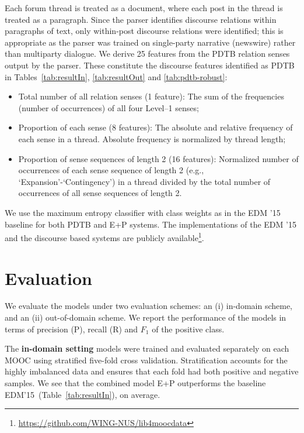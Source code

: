 \documentclass[letterpaper]{article}
\begin{document}
Each forum thread is treated as a document, where each post in the thread 
is treated as a paragraph. Since the parser identifies discourse relations 
within paragraphs of text, only within-post discourse relations 
were identified; this is appropriate as the parser was trained on
single-party narrative (newswire) rather than multiparty dialogue.  
We derive 25 features from the PDTB relation senses output by the parser. 
These constitute the discourse features identified as PDTB in 
Tables~\ref{tab:resultIn}, \ref{tab:resultOut} and \ref{tab:pdtb-robust}:

\begin{itemize}
\item Total number of all relation senses (1 feature): The sum of the 
frequencies (number of occurrences) of all four Level--1 senses;
\item Proportion of each sense (8 features): The absolute and relative 
frequency of each sense in a thread. Absolute frequency 
is normalized by thread length;
\item Proportion of sense sequences of length 2 (16 features): Normalized 
number of occurrences of each sense sequence of length 2 
(e.g., `Expansion'-`Contingency') in a thread divided by the total 
number of occurrences of all sense sequences of length 2.
\end{itemize}

\noindent We use the maximum entropy classifier with class weights 
as in the EDM '15 baseline for both PDTB and E+P systems. The implementations 
of the EDM '15 and the discourse based systems are 
publicly available\footnote{\url{https://github.com/WING-NUS/lib4moocdata}}.


\section{Evaluation}
\label{sect:result}
We evaluate the models under two evaluation schemes: an 
(i) in-domain scheme, and 
an (ii) out-of-domain scheme. We report the performance 
of the models in terms of precision (P), recall (R) and 
$F_1$ of the positive class.

The \textbf{in-domain setting} models were trained and evaluated separately on 
each MOOC using stratified five-fold cross validation. Stratification accounts 
for the highly imbalanced data and ensures that each fold had both positive and
negative samples. We see that the combined model E+P outperforms the baseline 
EDM'15~(Table~\ref{tab:resultIn}), on average. 
\end{document}
